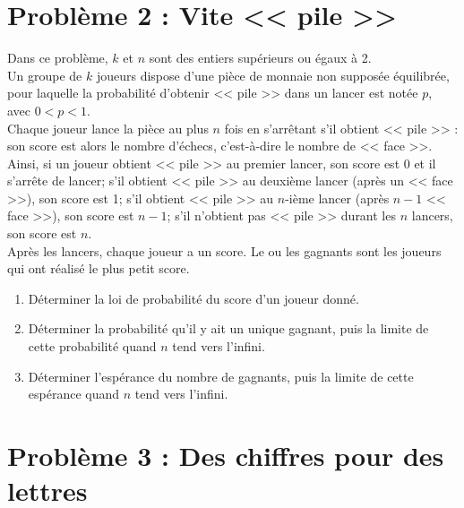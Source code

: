 \documentclass[landscape,twocolumn,leqno,a4paper,10pt]{report} %
\newcommand\n{\noindent}
\begin{document}
\newpage

\section{Problème 2 : Vite << pile >>}

\n Dans ce problème, $k$ et $n$ sont des entiers supérieurs ou égaux à 2.\\
Un groupe de $k$ joueurs dispose d'une pièce de monnaie non supposée équilibrée, pour laquelle la probabilité d'obtenir << pile >> dans un lancer est notée $p$, avec $0<p<1$.\\
Chaque joueur lance la pièce au plus $n$ fois en s'arrêtant s'il obtient << pile >> : son score est alors le nombre d'échecs, c'est-à-dire le nombre de << face >>. Ainsi, si un joueur obtient << pile >> au premier lancer, son score est 0 et il s'arrête de lancer; s'il obtient << pile >> au deuxième lancer (après un << face >>), son score est 1; s'il obtient << pile >> au $n$-ième lancer (après $n-1$ << face >>), son score est $n-1$; s'il n'obtient pas << pile >> durant les $n$ lancers, son score est $n$.\\
Après les lancers, chaque joueur a un score. Le ou les gagnants sont les joueurs qui ont réalisé le plus petit score.

\begin{enumerate}
	\item Déterminer la loi de probabilité du score d'un joueur donné.
	\item Déterminer la probabilité qu'il y ait un unique gagnant, puis la limite de cette probabilité quand $n$ tend vers l'infini.
	\item Déterminer l'espérance du nombre de gagnants, puis la limite de cette espérance quand $n$ tend vers l'infini.
\end{enumerate}

\newpage

\section{Problème 3 : Des chiffres pour des lettres}
\end{document}
